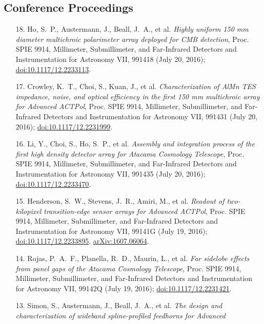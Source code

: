 \documentclass[margin,line]{res}
\begin{document}
\begin{resume}
\section{\sc Conference Proceedings} 
\begin{enumerate}

\item[{18.}] Ho, S.~P., Austermann, J., Beall, J.~A., et al.
    \textit{Highly uniform 150 mm diameter multichroic polarimeter array
    deployed for CMB detection}, Proc. SPIE 9914,
    Millimeter, Submillimeter, and Far-Infrared Detectors and Instrumentation for
    Astronomy VII, 991418 (July 20, 2016);
    \href{http://dx.doi.org/10.1117/12.2233113}{doi:10.1117/12.2233113}.
\item[{17.}] Crowley, K.~T., Choi, S., Kuan, J., et al.
    \textit{Characterization of AlMn TES impedance, noise, and optical efficiency
    in the first 150 mm multichroic array for Advanced ACTPol}, Proc. SPIE 9914,
    Millimeter, Submillimeter, and Far-Infrared Detectors and Instrumentation for
    Astronomy VII, 991431 (July 20, 2016);
    \href{http://dx.doi.org/10.1117/12.2231999}{doi:10.1117/12.2231999}.
\item[{16.}] Li, Y., Choi, S., Ho, S.~P., et al. \textit{Assembly and
    integration process of the first high density detector array for Atacama
    Cosmology Telescope}, Proc. SPIE 9914, Millimeter, Submillimeter, and
    Far-Infrared Detectors and Instrumentation for Astronomy VII, 991435 (July 20,
    2016); \href{http://dx.doi.org/10.1117/12.2233470}{doi:10.1117/12.2233470}.
\item[{15.}] Henderson, S.~W., Stevens, J.~R., Amiri, M., et al.
    \textit{Readout of two-kilopixel transition-edge sensor arrays for Advanced
    ACTPol}, Proc. SPIE 9914, Millimeter, Submillimeter, and Far-Infrared Detectors
    and Instrumentation for Astronomy VII, 99141G (July 19, 2016);
    \href{http://dx.doi.org/10.1117/12.2233895}{doi:10.1117/12.2233895},
    \href{http://arxiv.org/abs/1607.06064}{arXiv:1607.06064}.
\item[{14.}] Rojas, P.~A.~F., Planella, R.~D., Maurin, L., et al. \textit{Far
    sidelobe effects from panel gaps of the Atacama Cosmology Telescope}, Proc.
    SPIE 9914, Millimeter, Submillimeter, and Far-Infrared Detectors and
    Instrumentation for Astronomy VII, 99142Q (July 19, 2016);
    \href{http://dx.doi.org/10.1117/12.2231421}{doi:10.1117/12.2231421}.
\item[{13.}] Simon, S., Austermann, J., Beall, J.~A., et al. \textit{The design
    and characterization of wideband spline-profiled feedhorns for Advanced
}
\end{enumerate}
\end{resume}
\end{document}
